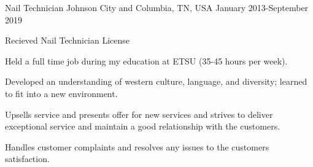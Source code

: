 

\begin{cventries}

  \cventry
    {Nail Technician} %
    {} %
    {Johnson City and Columbia, TN, USA} %
    {January 2013-September 2019} %
    {
      \begin{cvitems} %
      \item Recieved Nail Technician License
      \item Held a full time job during my education at ETSU (35-45 hours per week).
      \item Developed an understanding of western culture, language, and diversity; learned to fit into a new environment.
      \item Upsells service and presents offer for new services and strives to deliver exceptional service and maintain a good relationship with the customers.
      \item Handles customer complaints and resolves any issues to the customers satisfaction.
      \end{cvitems}
    }


\end{cventries}
